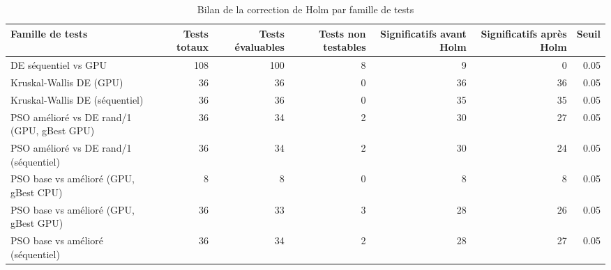 \begin{table}[t]
\centering
\caption{Bilan de la correction de Holm par famille de tests}
\label{tab:holm-summary}
\scriptsize
\begin{tabular}{p{4.0cm}rrrrrr}
\toprule
Famille de tests & Tests totaux & Tests évaluables & Tests non testables & Significatifs avant Holm & Significatifs après Holm & Seuil \\
\midrule
DE séquentiel vs GPU & 108 & 100 & 8 & 9 & 0 & 0.05 \\
Kruskal-Wallis DE (GPU) & 36 & 36 & 0 & 36 & 36 & 0.05 \\
Kruskal-Wallis DE (séquentiel) & 36 & 36 & 0 & 35 & 35 & 0.05 \\
PSO amélioré vs DE rand/1 (GPU, gBest GPU) & 36 & 34 & 2 & 30 & 27 & 0.05 \\
PSO amélioré vs DE rand/1 (séquentiel) & 36 & 34 & 2 & 30 & 24 & 0.05 \\
PSO base vs amélioré (GPU, gBest CPU) & 8 & 8 & 0 & 8 & 8 & 0.05 \\
PSO base vs amélioré (GPU, gBest GPU) & 36 & 33 & 3 & 28 & 26 & 0.05 \\
PSO base vs amélioré (séquentiel) & 36 & 34 & 2 & 28 & 27 & 0.05 \\
\bottomrule
\end{tabular}
\end{table}
